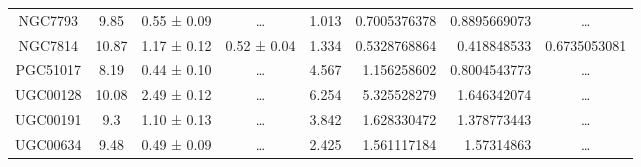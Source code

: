 \documentclass[reprint,%
 amsmath,amssymb,
 aps,
]{revtex4-1}
\begin{document}
\begin{table}[]
\begin{tabular}{cccccrrc}
\rowcolor[HTML]{F3F3F3} 
NGC7793              & 9.85                      & 0.55 ± 0.09           & …                      & 1.013                                                        & 0.7005376378                                                          & 0.8895669073                                                          & …                                                             \\
\rowcolor[HTML]{F3F3F3} 
NGC7814              & 10.87                     & 1.17 ± 0.12           & 0.52 ± 0.04            & 1.334                                                        & 0.5328768864                                                          & 0.418848533                                                           & \multicolumn{1}{r}{\cellcolor[HTML]{F3F3F3}0.6735053081}      \\
\rowcolor[HTML]{F3F3F3} 
PGC51017             & 8.19                      & 0.44 ± 0.10           & …                      & 4.567                                                        & 1.156258602                                                           & 0.8004543773                                                          & …                                                             \\
\rowcolor[HTML]{F3F3F3} 
UGC00128             & 10.08                     & 2.49 ± 0.12           & …                      & 6.254                                                        & 5.325528279                                                           & 1.646342074                                                           & …                                                             \\
\rowcolor[HTML]{F3F3F3} 
UGC00191             & 9.3                       & 1.10 ± 0.13           & …                      & 3.842                                                        & 1.628330472                                                           & 1.378773443                                                           & …                                                             \\
\rowcolor[HTML]{F3F3F3} 
UGC00634             & 9.48                      & 0.49 ± 0.09           & …                      & 2.425                                                        & 1.561117184                                                           & 1.57314863                                                            & …                                                             \\

\end{tabular}
\end{table}
\end{document}
